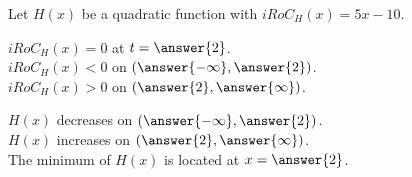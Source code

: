 \documentclass{ximera}
\author{Lee Wayand}
\begin{document}
\begin{exercise} 









Let $H(x)$ be a quadratic function with $iRoC_H(x) = 5x - 10$. \\






\begin{question}



$iRoC_H(x) = 0$  at  $t = \answer{2}$. \\


$iRoC_H(x) < 0$ on $\left( \answer{-\infty}, \answer{2} \right)$. \\


$iRoC_H(x) > 0$ on $\left( \answer{2}, \answer{\infty} \right)$. \\

\end{question}





\begin{question}



$H(x)$ decreases on $\left( \answer{-\infty}, \answer{2} \right)$. \\


$H(x)$ increases on $\left( \answer{2}, \answer{\infty} \right)$. \\


The minimum of $H(x)$ is located at  $x = \answer{2}$. \\

\end{question}
















\end{exercise}
\end{document}
